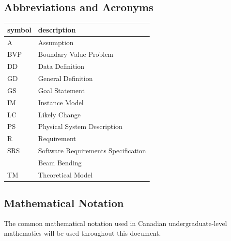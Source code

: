 \documentclass[12pt]{article}
\begin{document}
\subsection{Abbreviations and Acronyms}

\renewcommand{\arraystretch}{1.2}

\begin{center}
    \begin{tabular}{l l}
        \toprule
        \textbf{symbol} & \textbf{description}                \\
        \midrule
        A               & Assumption                          \\
        BVP             & Boundary Value Problem              \\
        DD              & Data Definition                     \\
        GD              & General Definition                  \\
        GS              & Goal Statement                      \\
        IM              & Instance Model                      \\
        LC              & Likely Change                       \\
        PS              & Physical System Description         \\
        R               & Requirement                         \\
        SRS             & Software Requirements Specification \\
        \progname{}     & Beam Bending                        \\
        TM              & Theoretical Model                   \\
        \bottomrule
    \end{tabular}
\end{center}

\subsection{Mathematical Notation}

The common mathematical notation used in Canadian undergraduate-level
mathematics will be used throughout this document.

\newpage


\end{document}
